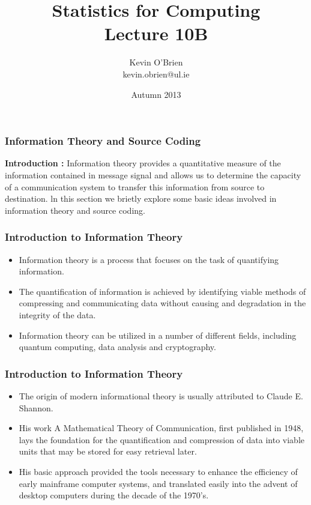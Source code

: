 \documentclass[a4]{beamer}
\title[MA4413]{Statistics for Computing \\ {\normalsize Lecture 10B}}
\author[Kevin O'Brien]{Kevin O'Brien \\ {\scriptsize kevin.obrien@ul.ie}}
\date{Autumn 2013}
\institute[Maths \& Stats]{Dept. of Mathematics \& Statistics, \\ University \textit{of} Limerick}
\begin{document}

\begin{frame}

\frametitle{Information Theory and Source Coding}

\textbf{ Introduction : } Information theory provides a quantitative measure of the information contained in message signal and allows us to determine the capacity of a communication system to transfer this information from source to destination.
ln this section we brietly explore some basic ideas involved in information theory and source coding.
\end{frame}


\begin{frame}
\frametitle{Introduction to Information Theory}
\begin{itemize}
\item Information theory is a process that focuses on the task of quantifying information. 
\item The quantification of information is achieved by identifying viable methods of compressing and communicating data without causing 
and degradation in the integrity of the data. 
\item Information theory can be utilized in a number of different fields, including quantum computing, 
data analysis and cryptography.
\end{itemize}
\end{frame}
\begin{frame}
\frametitle{Introduction to Information Theory}
\begin{itemize}
\item The origin of modern informational theory is usually attributed to Claude E. Shannon.
\item His work A Mathematical Theory of Communication, first published in 1948, 
lays the foundation for the quantification and compression of data into viable units that may be stored for easy retrieval later. 
\item His basic approach provided the tools necessary to enhance the efficiency of early mainframe computer systems, and translated easily into 
the advent of desktop computers during the decade of the 1970’s.
\end{itemize}
\end{frame}
\end{document}
